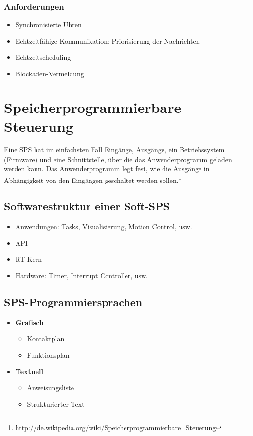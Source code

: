 \subsubsection{Anforderungen}
\begin{itemize}
	\item Synchronisierte Uhren
	\item Echtzeitfähige Kommunikation: Priorisierung der Nachrichten
	\item Echtzeitscheduling
	\item Blockaden-Vermeidung
\end{itemize}



\section{Speicherprogrammierbare Steuerung}
Eine SPS hat im einfachsten Fall Eingänge, Ausgänge, ein Betriebssystem (Firmware) und eine Schnittstelle, über die das Anwenderprogramm geladen werden kann. Das Anwenderprogramm legt fest, wie die Ausgänge in Abhängigkeit von den Eingängen geschaltet werden sollen.\footnote{\url{http://de.wikipedia.org/wiki/Speicherprogrammierbare_Steuerung}}


\subsection{Softwarestruktur einer Soft-SPS}
\begin{itemize}
	\item Anwendungen: Tasks, Visualisierung, Motion Control, usw.
	\item API
	\item RT-Kern
	\item Hardware: Timer, Interrupt Controller, usw.
\end{itemize}


\subsection{SPS-Programmiersprachen}
\begin{itemize}
	\item \textbf{Grafisch}
	\begin{itemize}
		\item Kontaktplan
		\item Funktionsplan
	\end{itemize}
	\item \textbf{Textuell}
	\begin{itemize}
		\item Anweisungsliste
		\item Strukturierter Text
	\end{itemize}
\end{itemize}


